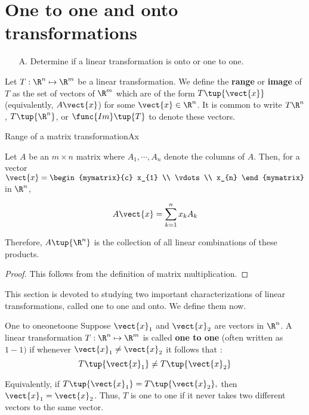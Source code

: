 \section{One to one and onto transformations}

\begin{outcome}
\begin{enumerate}
\item[A.]  Determine if a linear transformation is onto or one to one.
\end{enumerate}
\end{outcome}

Let $T: \R^n \mapsto \R^m$ be a linear transformation. We define the \textbf{range} or \textbf{image} of $T$ as the set of vectors of $\R^{m}$ which are of the form
$T \tup{\vect{x}}$ (equivalently, $A\vect{x}$) for some $\vect{x}\in \R^{n}$. It is common
to write $T\R^{n}$, $T\tup{\R^{n}}$, or
$\func{Im}\tup{T} $ to denote these vectors.  

\begin{lemma}{Range of a matrix transformation}{Ax}

Let $A$ be an $m\times n$ matrix where $A_{1},\cdots , A_{n}$ denote the columns of
$A$. Then, for a vector $\vect{x}=\begin{mymatrix}{c}
x_{1} \\
\vdots \\
 x_{n}
\end{mymatrix}$ in $\R^n$,

\begin{equation*}
A\vect{x}=\sum_{k=1}^{n}x_{k}A_{k}
\end{equation*}

Therefore, $A \tup{\R^n }$ is the collection of all
linear combinations of these products.
\end{lemma}

\begin{proof}
This follows from the definition of matrix multiplication.
\end{proof}

This section is devoted to studying two important characterizations of linear transformations, called one to one and onto. We define them now. 

\begin{definition}{One to one}{onetoone}
Suppose $\vect{x}_1$ and $\vect{x}_2$ are vectors in $\R^n$. A linear transformation $T: \R^n \mapsto \R^m$ is called \textbf{one to one} (often written as $1-1)$ if whenever
 $\vect{x}_1 \neq \vect{x}_2$ it follows that :
\begin{equation*}
T\tup{\vect{x}_1 } \neq T \tup{\vect{x}_2}
\end{equation*}

Equivalently, if $T\tup{\vect{x}_1 } =T\tup{\vect{x}_2} ,$
then $\vect{x}_1 = \vect{x}_2$. Thus,  $T$ is one to one if it never takes two different
vectors to the same vector.
\end{definition}

